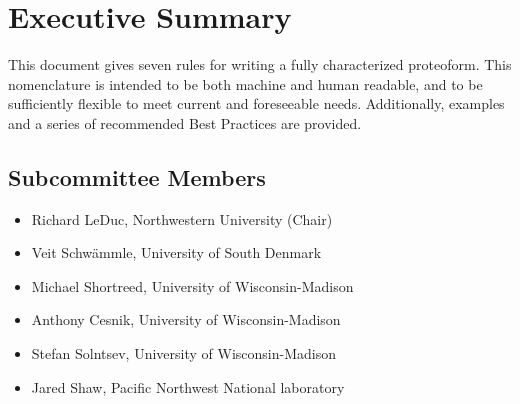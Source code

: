 
\section{Executive Summary}

This document gives seven rules for writing a fully characterized proteoform. This nomenclature is intended to be both machine and human readable, and to be sufficiently flexible to meet current and foreseeable needs. Additionally, examples and a series of recommended Best Practices are provided.

\subsection*{Subcommittee Members}

\begin{itemize}
\item Richard LeDuc, Northwestern University (Chair)
\item Veit Schwämmle, University of South Denmark
\item Michael Shortreed, University of Wisconsin-Madison
\item Anthony Cesnik, University of Wisconsin-Madison
\item Stefan Solntsev, University of Wisconsin-Madison
\item Jared Shaw, Pacific Northwest National laboratory
\end{itemize}